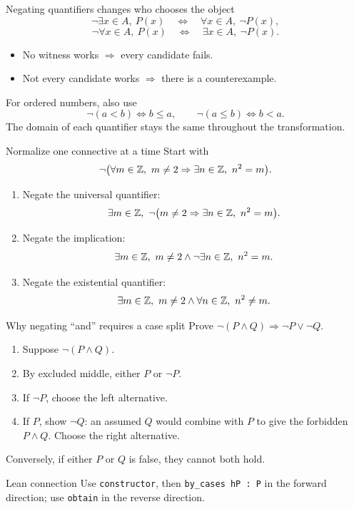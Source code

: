 \begin{frame}{Negating quantifiers changes who chooses the object}
\[
\neg\exists x\in A,\ P(x)\quad\Longleftrightarrow\quad
\forall x\in A,\ \neg P(x),
\]
\[
\neg\forall x\in A,\ P(x)\quad\Longleftrightarrow\quad
\exists x\in A,\ \neg P(x).
\]
\begin{itemize}
\item No witness works $\Rightarrow$ every candidate fails.
\item Not every candidate works $\Rightarrow$ there is a counterexample.
\end{itemize}
For ordered numbers, also use
\[
\neg(a<b)\Longleftrightarrow b\le a,\qquad
\neg(a\le b)\Longleftrightarrow b<a.
\]
The domain of each quantifier stays the same throughout the transformation.
\end{frame}

\begin{frame}{Normalize one connective at a time}
Start with
\[
\neg\bigl(\forall m\in\Z,\ m\ne2\Rightarrow\exists n\in\Z,\ n^2=m\bigr).
\]
\begin{enumerate}
\item Negate the universal quantifier:
\[
\exists m\in\Z,\ \neg\bigl(m\ne2\Rightarrow\exists n\in\Z,\ n^2=m\bigr).
\]
\item Negate the implication:
\[
\exists m\in\mathbb{Z},\ m\ne2\land\neg\exists n\in\mathbb{Z},\ n^2=m.
\]
\item Negate the existential quantifier:
\[
\exists m\in\Z,\ m\ne2\land\forall n\in\Z,\ n^2\ne m.
\]
\end{enumerate}
\end{frame}

\begin{frame}{Why negating ``and'' requires a case split}
Prove $\neg(P\land Q)\Rightarrow\neg P\lor\neg Q$.
\begin{enumerate}
\item Suppose $\neg(P\land Q)$.
\item By excluded middle, either $P$ or $\neg P$.
\item If $\neg P$, choose the left alternative.
\item If $P$, show $\neg Q$: an assumed $Q$ would combine with $P$ to give the forbidden $P\land Q$. Choose the right alternative.
\end{enumerate}
Conversely, if either $P$ or $Q$ is false, they cannot both hold.
\begin{block}{Lean connection}
Use \texttt{constructor}, then \texttt{by\_cases hP : P} in the forward direction; use \texttt{obtain} in the reverse direction.
\end{block}
\end{frame}


